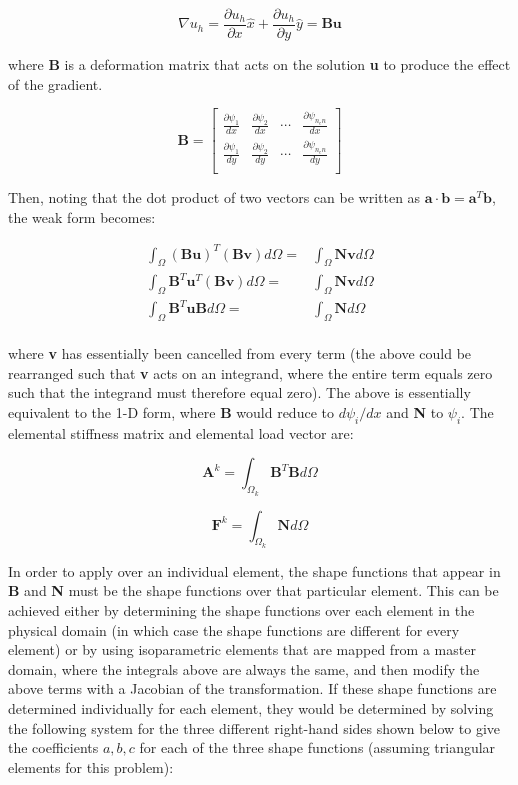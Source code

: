 \documentclass[10pt]{article}
\newcommand{\beq}{\begin{equation}}
\newcommand{\eeq}{\end{equation}}
\newcommand{\beqa}{\begin{equation}\begin{aligned}}
\newcommand{\eeqa}{\end{aligned}\end{equation}}
\begin{document}
\beq
\nabla u_h=\frac{\partial u_h}{\partial x}\hat{x}+\frac{\partial u_h}{\partial y}\hat{y}=\textbf{B}\textbf{u}
\eeq

where \textbf{B} is a deformation matrix that acts on the solution \textbf{u} to produce the effect of the gradient. 

\beq
\textbf{B}=\begin{bmatrix}
\frac{\partial\psi_1}{dx} & \frac{\partial\psi_2}{dx} & \cdots & \frac{\partial\psi_{n_en}}{dx}\\
\frac{\partial\psi_1}{dy} & \frac{\partial\psi_2}{dy} & \cdots & \frac{\partial\psi_{n_en}}{dy}\\
\end{bmatrix}
\eeq

Then, noting that the dot product of two vectors can be written as \(\textbf{a}\cdot\textbf{b}=\textbf{a}^T\textbf{b}\), the weak form becomes:

\beqa
\int_\Omega (\textbf{B}\textbf{u})^T(\textbf{B}\textbf{v})d\Omega=&\int_\Omega \textbf{N}\textbf{v}d\Omega\\
\int_\Omega \textbf{B}^T\textbf{u}^T(\textbf{B}\textbf{v})d\Omega=&\int_\Omega \textbf{N}\textbf{v}d\Omega\\
\int_\Omega \textbf{B}^T\textbf{u}\textbf{B}d\Omega=&\int_\Omega \textbf{N}d\Omega\\
\eeqa

where \textbf{v} has essentially been cancelled from every term (the above could be rearranged such that \textbf{v} acts on an integrand, where the entire term equals zero such that the integrand must therefore equal zero). The above is essentially equivalent to the 1-D form, where \textbf{B} would reduce to \(d\psi_i/dx\) and \textbf{N} to \(\psi_i\). The elemental stiffness matrix and elemental load vector are:

\beq
\textbf{A}^k=\int_{\Omega_k} \textbf{B}^T\textbf{B}d\Omega
\eeq

\beq
\textbf{F}^k=\int_{\Omega_k} \textbf{N}d\Omega
\eeq

In order to apply over an individual element, the shape functions that appear in \textbf{B} and \textbf{N} must be the shape functions over that particular element. This can be achieved either by determining the shape functions over each element in the physical domain (in which case the shape functions are different for every element) or by using isoparametric elements that are mapped from a master domain, where the integrals above are always the same, and then modify the above terms with a Jacobian of the transformation. If these shape functions are determined individually for each element, they would be determined by solving the following system for the three different right-hand sides shown below to give the coefficients \(a, b, c\) for each of the three shape functions (assuming triangular elements for this problem):
\end{document}
